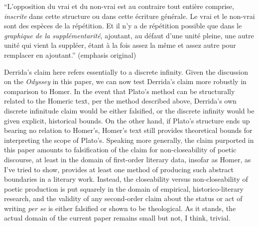 \documentclass[12pt]{article}
\begin{document}
\singlespacing \noindent \hfill \par
\indent\parbox{\textwidth}{``L'opposition du vrai et du non-vrai est au contraire tout entière comprise, \textit{inscrite}  dans cette structure ou dans cette écriture générale. Le vrai et le non-vrai sont des espèces de la répétition. Et il n'y a de répétition possible que dans le \textit{graphique de la supplémentarité}, ajoutant, au défaut d'une unité pleine, une autre unité qui vient la suppléer, étant à la fois assez la même et assez autre pour remplacer en ajoutant.'' (emphasis original)}

\doublespacing \noindent \hfill \par
\noindent Derrida's claim here refers essentially to a discrete infinity. Given the discussion on the \textit{Odyssey} in this paper, we can now test Derrida's claim more robustly in comparison to Homer. In the event that Plato's method can be structurally related to the Homeric text, per the method described above, Derrida's own discrete infinitude claim would be either falsified, or the discrete infinity would be given explicit, historical bounds. On the other hand, if Plato's structure ends up bearing no relation to Homer's, Homer's text still provides theoretical bounds for interpreting the scope of Plato's. Speaking more generally, the claim purported in this paper amounts to falsification of the claim for non-closeability of poetic discourse, at least in the domain of first-order literary data, insofar as Homer, as I've tried to show, provides at least one method of producing such abstract boundaries in a literary work. Instead, the closeability versus non-closeability of poetic production is put squarely in the domain of empirical, historico-literary research, and the validity of any second-order claim about the status or act of writing \textit{per se} is either falsified or shown to be theological. As it stands, the actual domain of the current paper remains small but not, I think, trivial.

\singlespacing
\nocite{*}
\printbibliography[heading=bibintoc]
\end{document}
